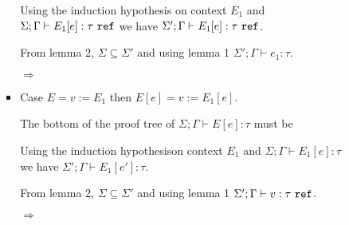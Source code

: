 \begin{enumerate}[(a)]
\begin{enumerate}[i.]
\begin{itemize}
\begin{itemize}
  Using the induction hypothesis on context $E_1$ and $\Sigma;\Gamma \vdash E_1[e] : \tau~\texttt{ref}$ we have $\Sigma';\Gamma \vdash E_1[e] : \tau~\texttt{ref}$.

  From lemma 2, $\Sigma \subseteq \Sigma'$ and using lemma 1 $\Sigma' ;\Gamma \vdash e_1 : \tau$.

  $\Rightarrow$
  \item Case $E = v := E_1$ then $E[e] = v := E_1[e]$. 

  The bottom of the proof tree of $\Sigma;\Gamma \vdash E[e] : \tau$ must be 

  Using the induction hypothesison context $E_1$ and $\Sigma;\Gamma \vdash E_1[e] : \tau$ \\
  we have $\Sigma';\Gamma \vdash E_1[e'] : \tau$.

  From lemma 2, $\Sigma \subseteq \Sigma'$ and using lemma 1 $\Sigma' ; \Gamma \vdash v : \tau ~ \texttt{ref}$.

  $\Rightarrow$
\end{itemize} 
\end{itemize}

\end{enumerate}
\end{enumerate}
